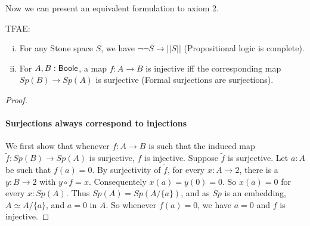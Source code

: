 Now we can present an equivalent formulation to axiom 2. 
\begin{lemma}
  TFAE:
  \begin{enumerate}[(i)]
    \item For any Stone space $S$, we have $\neg \neg S \to ||S||$ (Propositional logic is complete).
    \item For $A,B:\mathsf{Boole}$, a map $f:A\to B$ is injective iff the corresponding map $Sp(B) \to Sp(A)$ is surjective
      (Formal surjections are surjections). 
  \end{enumerate}
\end{lemma} 
\begin{proof}
\item \paragraph{Surjections always correspond to injections}
  We first show that whenever $f:A\to B$ is such that the induced map $\tilde f:Sp(B)\to Sp(A)$ is surjective, 
  $f$ is injective. Suppose $\tilde f $ is surjective. 
  Let $a:A$ be such that $f(a)= 0$. 
  By surjectivity of $\tilde f$, for every $x:A\to 2$, there is a $y:B\to 2$ with $y\circ f = x$. 
  Consequentely $x(a) = y(0) = 0$. So $x(a) = 0$ for every $x:Sp(A)$. 
  Thus $Sp(A) = Sp(A/\{a\})$, and as $Sp$ is an embedding, $A \simeq A/\{a\}$, and $a = 0$ in $A$. 
  So whenever $f(a) = 0$, we have $a=0$ and $f$ is injective. 



\end{proof}
